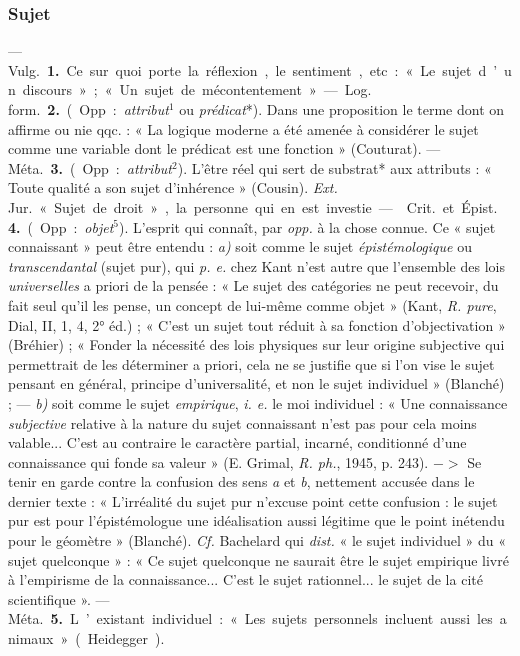 \subsubsection{Sujet}
 —  \si{Vulg.} {\bf 1.} Ce sur quoi porte la
réflexion, le sentiment, etc. : « Le sujet d’un discours »; « Un sujet de
mécontentement ». — \si{Log. form.}  {\bf 2.} (Opp. : {\it attribut}$^1$ ou
{\it prédicat}*). Dans une proposition le terme dont on affirme ou nie
qqc. : « La logique moderne a été amenée à considérer le sujet comme une
variable dont le prédicat est une fonction » (Couturat). — \si{Méta.}
{\bf 3.} (Opp. : {\it attribut}$^2$). L'être réel qui sert de substrat* aux
attributs : « Toute qualité a son sujet d’inhérence » (Cousin). {\it Ext.}
\si{Jur.} « Sujet de droit », la personne qui en est investie.

—  \si{Crit.} et \si{Épist.} {\bf 4.} (Opp. :
{\it objet}$^5$). L'esprit qui connaît, par {\it opp.} à la chose connue. Ce
« sujet connaissant » peut être entendu : {\it a)} soit comme le sujet {\it
épistémologique} ou {\it transcendantal} (sujet pur), qui {\it p. e.} chez
Kant n’est autre que l’ensemble des lois {\it universelles} a priori de la
pensée : « Le sujet des catégories ne peut recevoir, du fait seul qu'il les
pense, un concept de lui-même comme objet » (Kant, {\it R. pure}, Dial, II,
1, 4, 2° éd.) ; « C’est un sujet tout réduit à sa fonction d’objectivation
» (Bréhier) ; « Fonder la nécessité des lois physiques sur leur origine
subjective qui permettrait de les déterminer a priori, cela ne se justifie
que si l'on vise le sujet pensant en général, principe d'universalité, et
non le sujet individuel » (Blanché) ; — {\it b)} soit comme le sujet {\it
empirique}, {\it i. e.} le moi individuel : « Une connaissance {\it
subjective} relative à la nature du sujet connaissant n’est pas pour cela
moins valable... C'est au contraire le caractère partial, incarné,
conditionné d’une connaissance qui fonde sa valeur » (E. Grimal, {\it R.
ph.}, 1945, p. 243). $->$ Se
tenir en garde contre la confusion des sens {\it a} et {\it b}, nettement
accusée dans le dernier texte : « L’irréalité du sujet pur n’excuse point
cette confusion : le sujet pur est pour l’épistémologue une idéalisation
aussi légitime que le point inétendu pour le géomètre » (Blanché). {\it Cf.}
Bachelard qui {\it dist.} « le sujet individuel » du « sujet quelconque » :
« Ce sujet quelconque ne saurait être le sujet empirique livré à l’empirisme
de la connaissance... C'est le sujet rationnel... le sujet de la cité
scientifique ». — \si{Méta.} {\bf 5.} L’existant individuel : « Les sujets
personnels incluent aussi les animaux » (Heidegger).

